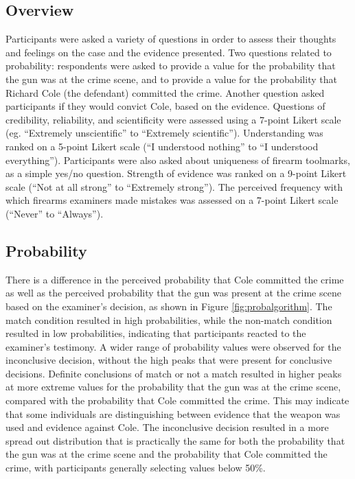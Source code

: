 \documentclass[print]{nuthesis}
\begin{document}
\hypertarget{overview}{%
\subsection{Overview}\label{overview}}

Participants were asked a variety of questions in order to assess their thoughts and feelings on the case and the evidence presented.
Two questions related to probability: respondents were asked to provide a value for the probability that the gun was at the crime scene, and to provide a value for the probability that Richard Cole (the defendant) committed the crime.
Another question asked participants if they would convict Cole, based on the evidence.
Questions of credibility, reliability, and scientificity were assessed using a 7-point Likert scale (eg. ``Extremely unscientific'' to ``Extremely scientific'').
Understanding was ranked on a 5-point Likert scale (``I understood nothing'' to ``I understood everything'').
Participants were also asked about uniqueness of firearm toolmarks, as a simple yes/no question.
Strength of evidence was ranked on a 9-point Likert scale (``Not at all strong'' to ``Extremely strong''). The perceived frequency with which firearms examiners made mistakes was assessed on a 7-point Likert scale (``Never'' to ``Always'').

\hypertarget{probability}{%
\subsection{Probability}\label{probability}}

There is a difference in the perceived probability that Cole committed the crime as well as the perceived probability that the gun was present at the crime scene based on the examiner's decision, as shown in Figure \ref{fig:probalgorithm}.
The match condition resulted in high probabilities, while the non-match condition resulted in low probabilities, indicating that participants reacted to the examiner's testimony.
A wider range of probability values were observed for the inconclusive decision, without the high peaks that were present for conclusive decisions.
Definite conclusions of match or not a match resulted in higher peaks at more extreme values for the probability that the gun was at the crime scene, compared with the probability that Cole committed the crime.
This may indicate that some individuals are distinguishing between evidence that the weapon was used and evidence against Cole.
The inconclusive decision resulted in a more spread out distribution that is practically the same for both the probability that the gun was at the crime scene and the probability that Cole committed the crime, with participants generally selecting values below 50\%.
\end{document}
